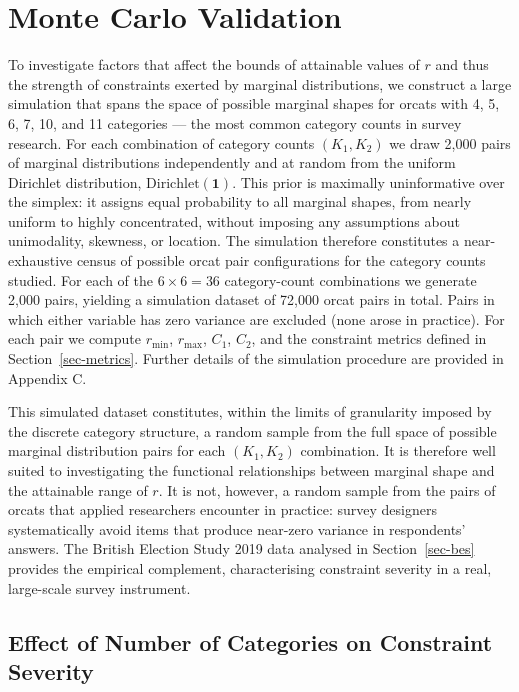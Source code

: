 \documentclass[
  12pt,
]{article}
\theoremstyle{plain}
\theoremstyle{definition}
\theoremstyle{remark}
\begin{document}
\section{Monte Carlo Validation}\label{sec-MCsim}

To investigate factors that affect the bounds of attainable values of
\(r\) and thus the strength of constraints exerted by marginal
distributions, we construct a large simulation that spans the space of
possible marginal shapes for orcats with 4, 5, 6, 7, 10, and 11
categories --- the most common category counts in survey research. For
each combination of category counts \((K_1, K_2)\) we draw 2,000 pairs
of marginal distributions independently and at random from the uniform
Dirichlet distribution, \(\text{Dirichlet}(\mathbf{1})\). This prior is
maximally uninformative over the simplex: it assigns equal probability
to all marginal shapes, from nearly uniform to highly concentrated,
without imposing any assumptions about unimodality, skewness, or
location. The simulation therefore constitutes a near-exhaustive census
of possible orcat pair configurations for the category counts studied.
For each of the \(6 \times 6 = 36\) category-count combinations we
generate 2,000 pairs, yielding a simulation dataset of 72,000 orcat
pairs in total. Pairs in which either variable has zero variance are
excluded (none arose in practice). For each pair we compute
\(r_{\min}\), \(r_{\max}\), \(C_1\), \(C_2\), and the constraint metrics
defined in Section~\ref{sec-metrics}. Further details of the simulation
procedure are provided in Appendix C.

This simulated dataset constitutes, within the limits of granularity
imposed by the discrete category structure, a random sample from the
full space of possible marginal distribution pairs for each
\((K_1, K_2)\) combination. It is therefore well suited to investigating
the functional relationships between marginal shape and the attainable
range of \(r\). It is not, however, a random sample from the pairs of
orcats that applied researchers encounter in practice: survey designers
systematically avoid items that produce near-zero variance in
respondents' answers. The British Election Study 2019 data analysed in
Section~\ref{sec-bes} provides the empirical complement, characterising
constraint severity in a real, large-scale survey instrument.

\subsection{Effect of Number of Categories on Constraint
Severity}\label{effect-of-number-of-categories-on-constraint-severity}
\end{document}
